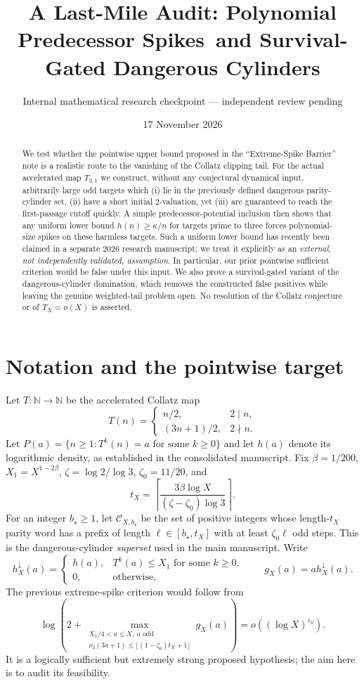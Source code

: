 \documentclass[11pt,a4paper]{article}
\title{A Last-Mile Audit: Polynomial Predecessor Spikes\ and Survival-Gated Dangerous Cylinders}
\author{Internal mathematical research checkpoint --- independent review pending}
\date{17 November 2026}
\newcommand{\N}{\mathbb N}
\newcommand{\calC}{\mathcal C}
\newcommand{\nuTwo}{\nu_2}
\begin{document}
\maketitle
\begin{abstract}
We test whether the pointwise upper bound proposed in the ``Extreme-Spike Barrier'' note is a realistic route to the vanishing of the Collatz clipping tail.  For the actual accelerated map $T_{3,1}$ we construct, without any conjectural dynamical input, arbitrarily large odd targets which (i) lie in the previously defined dangerous parity-cylinder set, (ii) have a short initial $2$-valuation, yet (iii) are guaranteed to reach the first-passage cutoff quickly.  A simple predecessor-potential inclusion then shows that any uniform lower bound $h(n)\ge\kappa/n$ for targets prime to three forces polynomial-size spikes on these harmless targets.  Such a uniform lower bound has recently been claimed in a separate 2026 research manuscript; we treat it explicitly as an \emph{external, not independently validated, assumption}.  In particular, our prior pointwise sufficient criterion would be false under this input.  We also prove a survival-gated variant of the dangerous-cylinder domination, which removes the constructed false positives while leaving the genuine weighted-tail problem open.  No resolution of the Collatz conjecture or of $T_X=o(X)$ is asserted.
\end{abstract}

\section{Notation and the pointwise target}
Let $T:\N\to\N$ be the accelerated Collatz map
\[
 T(n)=\begin{cases}n/2,&2\mid n,\\(3n+1)/2,&2\nmid n.\end{cases}
\]
Let $P(a)=\{n\ge1:T^k(n)=a\text{ for some }k\ge0\}$ and let $h(a)$ denote its logarithmic density, as established in the consolidated manuscript.  Fix $\beta=1/200$, $X_1=X^{1-2\beta}$, $\zeta=\log2/\log3$, $\zeta_0=11/20$, and
\[
 t_X=\left\lceil\frac{3\beta\log X}{(\zeta-\zeta_0)\log3}\right\rceil.
\]
For an integer $b_\star\ge1$, let $\calC_{X,b_\star}$ be the set of positive integers whose length-$t_X$ parity word has a prefix of length $\ell\in[b_\star,t_X]$ with at least $\zeta_0\ell$ odd steps.  This is the dangerous-cylinder \emph{superset} used in the main manuscript.  Write
\[
 h_X^\downarrow(a)=\begin{cases}h(a),&T^k(a)\le X_1\text{ for some }k\ge0,\\0,&\text{otherwise},\end{cases}
 \qquad g_X(a)=a h_X^\downarrow(a).
\]
The previous extreme-spike criterion would follow from
\[
\log\left(2+\max_{\substack{X_1/4<a\le X,\ a\text{ odd}\\
 \nuTwo(3a+1)\le \lfloor(1-\zeta_0)t_X+1\rfloor}}g_X(a)\right)
 =o((\log X)^{\varepsilon_0}).\tag{ES}
\]
It is a logically sufficient but extremely strong proposed hypothesis; the aim here is to audit its feasibility.
\end{document}
